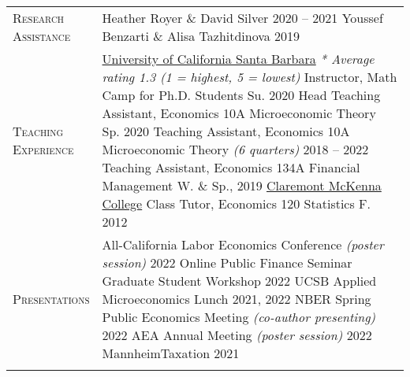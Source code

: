 \documentclass[11pt]{article}
\begin{document}
\begin{tabularx}{\textwidth}{@{}Y Z@{}}
	\textsc{Research \newline Assistance}  & 
	Heather Royer \& David Silver \hfill 2020 -- 2021 
	\vspace{3pt} \newline 
	Youssef Benzarti \& Alisa Tazhitdinova \hfill 2019
	\vspace{0pt}
	 \\ \addlinespace[20pt] 
	
	\textsc{Teaching \newline Experience}  & 
	\uline{University of California Santa Barbara}
	\vspace{3pt} \newline
	\textit{* Average rating 1.3 (1 = highest, 5 = lowest)}
	\vspace{3pt} \newline
	Instructor, Math Camp for Ph.D. Students \hfill Su. 2020
	\vspace{3pt} \newline
	Head Teaching Assistant, Economics 10A Microeconomic Theory \hfill Sp. 2020
	\vspace{3pt} \newline
	Teaching Assistant, Economics 10A Microeconomic Theory \textit{(6 quarters)} \hfill 2018 -- 2022
	\vspace{3pt} \newline
	Teaching Assistant, Economics 134A Financial Management  \hfill W. \& Sp., 2019
	\vspace{12pt} \newline
	\uline{Claremont McKenna College}
	\vspace{3pt} \newline
	Class Tutor, Economics 120 Statistics \hfill F. 2012
	\vspace{0pt}
	 \\ \addlinespace[20pt] 
	
	\textsc{Presentations} & 
	All-California Labor Economics Conference \textit{(poster session)}  \hfill  2022
	\vspace{3pt} \newline
	Online Public Finance Seminar Graduate Student Workshop \hfill  2022  
	\vspace{3pt} \newline
	UCSB Applied Microeconomics Lunch  \hfill  2021, 2022
	\vspace{3pt} \newline
	NBER Spring Public Economics Meeting \textit{(co-author presenting)}  \hfill  2022  
	\vspace{3pt} \newline
	AEA Annual Meeting \textit{(poster session)}  \hfill  2022 
	\vspace{3pt} \newline
	MannheimTaxation  \hfill  2021 
	\vspace{0pt}
	 \\ \addlinespace[20pt] 
	

\end{tabularx}
\end{document}
